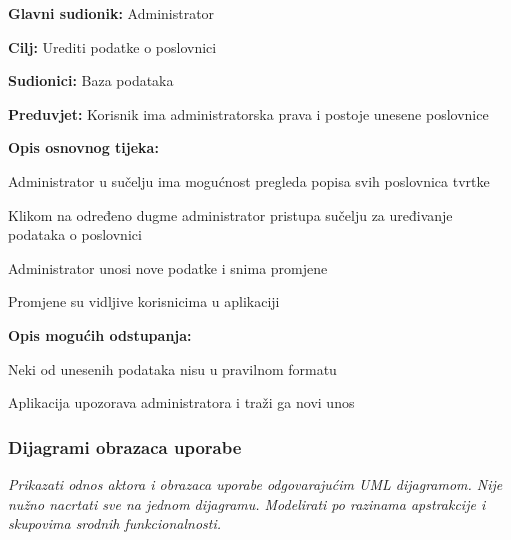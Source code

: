 					\noindent {}
					\begin{packed_item}
	
						\item \textbf{Glavni sudionik: }Administrator
						\item  \textbf{Cilj: }Urediti podatke o poslovnici
						\item  \textbf{Sudionici: }Baza podataka
						\item  \textbf{Preduvjet: }Korisnik ima administratorska prava i postoje unesene poslovnice
						\item  \textbf{Opis osnovnog tijeka:}
						
						\item[] \begin{packed_enum}
							\item Administrator u sučelju ima mogućnost pregleda popisa svih poslovnica tvrtke
							\item Klikom na određeno dugme administrator pristupa sučelju za uređivanje podataka o poslovnici
							\item Administrator unosi nove podatke i snima promjene
							\item Promjene su vidljive korisnicima u aplikaciji
						\end{packed_enum}
						
						\item  \textbf{Opis mogućih odstupanja: }
						
						\item[] \begin{packed_item}
	
							\item[3.a] Neki od unesenih podataka nisu u pravilnom formatu
							\item[] \begin{packed_enum}
								\item Aplikacija upozorava administratora i traži ga novi unos
							\end{packed_enum}
						\end{packed_item}
						
					\end{packed_item}
				
					
				\subsubsection{Dijagrami obrazaca uporabe}
					
					\textit{Prikazati odnos aktora i obrazaca uporabe odgovarajućim UML dijagramom. Nije nužno nacrtati sve na jednom dijagramu. Modelirati po razinama apstrakcije i skupovima srodnih funkcionalnosti.}
				\eject		
				
